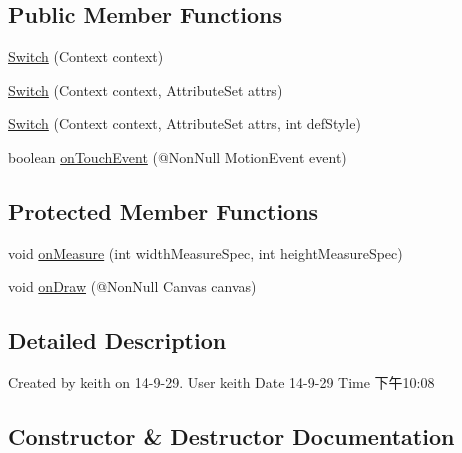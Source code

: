 \subsection*{Public Member Functions}
\begin{DoxyCompactItemize}
\item 
\hyperlink{classcom_1_1material_1_1widget_1_1_switch_a69f70827452d3a923c3b12a64cb9f501}{Switch} (Context context)
\item 
\hyperlink{classcom_1_1material_1_1widget_1_1_switch_a153eb541d86bbdfbcf4788e25446fd5d}{Switch} (Context context, Attribute\+Set attrs)
\item 
\hyperlink{classcom_1_1material_1_1widget_1_1_switch_aee05021beb02dfa4c103cdd3f1d6dfed}{Switch} (Context context, Attribute\+Set attrs, int def\+Style)
\item 
boolean \hyperlink{classcom_1_1material_1_1widget_1_1_switch_ae909ae22b75dcf091532c61000bd63ae}{on\+Touch\+Event} (@Non\+Null Motion\+Event event)
\end{DoxyCompactItemize}
\subsection*{Protected Member Functions}
\begin{DoxyCompactItemize}
\item 
void \hyperlink{classcom_1_1material_1_1widget_1_1_switch_a2df86e456c4484ad30bf1bf17f73a9ac}{on\+Measure} (int width\+Measure\+Spec, int height\+Measure\+Spec)
\item 
void \hyperlink{classcom_1_1material_1_1widget_1_1_switch_a0e4d39f840042358b17a831557838887}{on\+Draw} (@Non\+Null Canvas canvas)
\end{DoxyCompactItemize}


\subsection{Detailed Description}
Created by keith on 14-\/9-\/29. User keith Date 14-\/9-\/29 Time 下午10\+:08 

\subsection{Constructor \& Destructor Documentation}
\mbox{\label{classcom_1_1material_1_1widget_1_1_switch_a69f70827452d3a923c3b12a64cb9f501}} 
